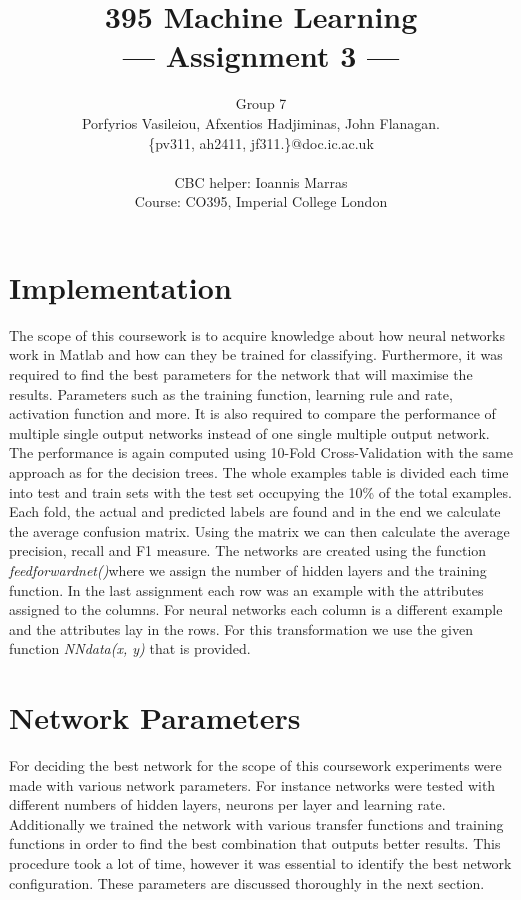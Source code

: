 \documentclass[a4paper,11pt]{article}
\title{395 Machine Learning\\\Large{--- Assignment 3 ---}}
\author{Group 7\\Porfyrios Vasileiou, Afxentios Hadjiminas, John Flanagan.\\
       \{pv311, ah2411, jf311.\}@doc.ic.ac.uk\\ \\
       \small{CBC helper: Ioannis Marras}\\
       \small{Course: CO395, Imperial College London}
}
\begin{document}
\maketitle

\section{Implementation}
The scope of this coursework is to acquire knowledge about how neural networks work in Matlab and how can they be trained for classifying. Furthermore, it was required to find the best parameters for the network that will maximise the results. Parameters such as the training function, learning rule and rate, activation function and more. It is also required to compare the performance of multiple single output networks instead of one single multiple output network. The performance is again computed using 10-Fold Cross-Validation with the same approach as for the decision trees. The whole examples table is divided each time into test and train sets with the test set occupying the 10\% of the total examples. Each fold, the actual and predicted labels are found and in the end we calculate the average confusion matrix. Using the matrix we can then calculate the average precision, recall and F1 measure. The networks are created using the function \emph{feedforwardnet()}where we assign the number of hidden layers and the training function. In the last assignment each row was an example with the attributes assigned to the columns. For neural networks each column is a different example and the attributes lay in the rows. For this transformation we use the given function \emph{NNdata(x, y)} that is provided. 


\section{Network Parameters}
For deciding the best network for the scope of this coursework experiments were made with various network parameters. For instance networks were tested with different numbers of hidden layers, neurons per layer and learning rate. Additionally we trained the network with various transfer functions and training functions in order to find the best combination that outputs better results. This procedure took a lot of time, however it was essential to identify the best network configuration. These parameters are discussed thoroughly in the next section.
\end{document}
